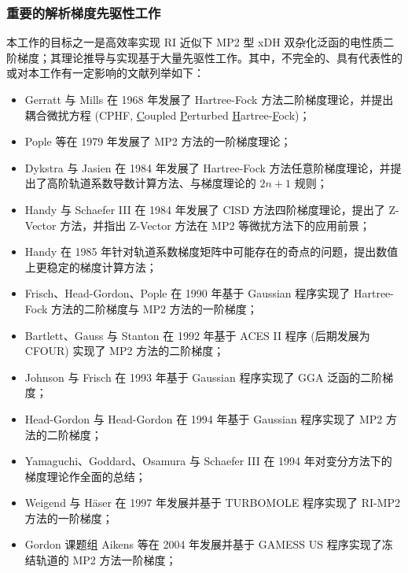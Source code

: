 \subsubsection{重要的解析梯度先驱性工作}

本工作的目标之一是高效率实现 RI 近似下 MP2 型 xDH 双杂化泛函的电性质二阶梯度；其理论推导与实现基于大量先驱性工作。其中，不完全的、具有代表性的或对本工作有一定影响的文献列举如下：
\begin{itemize}[nosep]
  \item Gerratt 与 Mills 在 1968 年发展了 Hartree-Fock 方法二阶梯度理论，并提出耦合微扰方程 (CPHF, \underline{C}oupled \underline{P}erturbed \underline{H}artree-\underline{F}ock)\cite{Gerratt-Mills.JCP.1968, Gerratt-Mills.JCP.1968a}；
  \item Pople 等在 1979 年发展了 MP2 方法的一阶梯度理论\cite{Pople-Binkley.IJQC.1979}；
  \item Dykstra 与 Jasien 在 1984 年发展了 Hartree-Fock 方法任意阶梯度理论，并提出了高阶轨道系数导数计算方法、与梯度理论的 $2n+1$ 规则\cite{Dykstra-Jasien.CPL.1984}；
  \item Handy 与 Schaefer III 在 1984 年发展了 CISD 方法四阶梯度理论，提出了 Z-Vector 方法，并指出 Z-Vector 方法在 MP2 等微扰方法下的应用前景\cite{Handy-Schaefer.JCP.1984}；
  \item Handy 在 1985 年针对轨道系数梯度矩阵中可能存在的奇点的问题，提出数值上更稳定的梯度计算方法\cite{Handy-Simandiras.CPL.1985}；
  \item Frisch、Head-Gordon、Pople 在 1990 年基于 Gaussian 程序实现了 Hartree-Fock 方法的二阶梯度与 MP2 方法的一阶梯度\cite{Frisch-Pople.CP.1990, Frisch-Pople.CPL.1990, Frisch-Pople.CPL.1990a}；
  \item Bartlett、Gauss 与 Stanton 在 1992 年基于 ACES II 程序 (后期发展为 CFOUR) 实现了 MP2 方法的二阶梯度\cite{Gauss-Bartlett.JCP.1992, Stanton-Bartlett.CPL.1992}；
  \item Johnson 与 Frisch 在 1993 年基于 Gaussian 程序实现了 GGA 泛函的二阶梯度\cite{Johnson-Frisch.CPL.1993}；
  \item Head-Gordon 与 Head-Gordon 在 1994 年基于 Gaussian 程序实现了 MP2 方法的二阶梯度\cite{Head-Gordon-Head-Gordon.CPL.1994}；
  \item Yamaguchi、Goddard、Osamura 与 Schaefer III 在 1994 年对变分方法下的梯度理论作全面的总结\cite{Yamaguchi-Schaefer.Oxford.1994}；
  \item Weigend 与 H\"aser 在 1997 年发展并基于 TURBOMOLE 程序实现了 RI-MP2 方法的一阶梯度\cite{Weigend-Haeser.TCA.1997}；
  \item Gordon 课题组 Aikens 等在 2004 年发展并基于 GAMESS US 程序实现了冻结轨道的 MP2 方法一阶梯度\cite{Aikens-Gordon.TCA.2003}；

\end{itemize}
